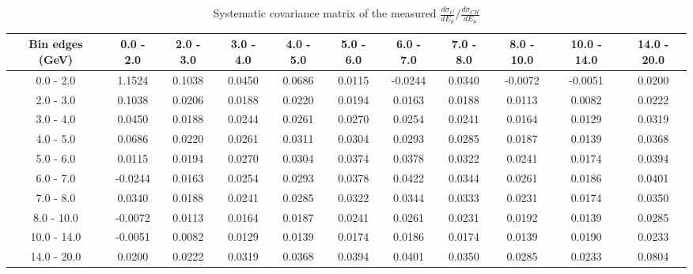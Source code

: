 \documentclass[aps,prl,twocolumn,superscriptaddress,nofootinbib]{revtex4-1}
\begin{document}
\begin{turnpage}
 \begin{table}[h!]
  \centering
  \caption{Systematic covariance matrix of the measured $\frac{d\sigma_{C}}{dE_{\mu}}/\frac{d\sigma_{CH}}{dE_{\mu}}$}
    \begin{tabular}{c||cccccccccc}
      Bin edges (GeV) & 0.0 - 2.0 & 2.0 - 3.0 & 3.0 - 4.0 & 4.0 - 5.0 & 5.0 - 6.0 & 6.0 - 7.0 & 7.0 - 8.0 & 8.0 - 10.0 & 10.0 - 14.0 & 14.0 - 20.0 \\
\hline \hline
        0.0 - 2.0 &  1.1524 &  0.1038 &  0.0450 &  0.0686 &  0.0115 & -0.0244 &  0.0340 & -0.0072 & -0.0051 &  0.0200 \\
        2.0 - 3.0 &  0.1038 &  0.0206 &  0.0188 &  0.0220 &  0.0194 &  0.0163 &  0.0188 &  0.0113 &  0.0082 &  0.0222 \\
        3.0 - 4.0 &  0.0450 &  0.0188 &  0.0244 &  0.0261 &  0.0270 &  0.0254 &  0.0241 &  0.0164 &  0.0129 &  0.0319 \\
        4.0 - 5.0 &  0.0686 &  0.0220 &  0.0261 &  0.0311 &  0.0304 &  0.0293 &  0.0285 &  0.0187 &  0.0139 &  0.0368 \\
        5.0 - 6.0 &  0.0115 &  0.0194 &  0.0270 &  0.0304 &  0.0374 &  0.0378 &  0.0322 &  0.0241 &  0.0174 &  0.0394 \\
        6.0 - 7.0 & -0.0244 &  0.0163 &  0.0254 &  0.0293 &  0.0378 &  0.0422 &  0.0344 &  0.0261 &  0.0186 &  0.0401 \\
        7.0 - 8.0 &  0.0340 &  0.0188 &  0.0241 &  0.0285 &  0.0322 &  0.0344 &  0.0333 &  0.0231 &  0.0174 &  0.0350 \\
       8.0 - 10.0 & -0.0072 &  0.0113 &  0.0164 &  0.0187 &  0.0241 &  0.0261 &  0.0231 &  0.0192 &  0.0139 &  0.0285 \\
      10.0 - 14.0 & -0.0051 &  0.0082 &  0.0129 &  0.0139 &  0.0174 &  0.0186 &  0.0174 &  0.0139 &  0.0190 &  0.0233 \\
      14.0 - 20.0 &  0.0200 &  0.0222 &  0.0319 &  0.0368 &  0.0394 &  0.0401 &  0.0350 &  0.0285 &  0.0233 &  0.0804 \\
    \end{tabular}
  \label{tablecov:C_Systematic_Emu}
  \end{table}
\end{turnpage}
\end{document}
